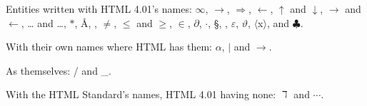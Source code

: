 Entities written with HTML 4.01's names: \(\infty\), \(\rightarrow\), \(\Rightarrow\),
\(\leftarrow\), \(\uparrow\) and \(\downarrow\), \(\to\) and \(\gets\), \dots{} and \dots{}, \(\ast\),
\AA{}, \textpm{}, \(\neq\), \(\le\) and \(\ge\), \(\in\), \(\partial\), \(\cdot\), \S, \dag{}, \(\varepsilon\),
\(\vartheta\), \(\langle\)x\(\rangle\), \textbullet{} and \(\clubsuit\).

With their own names where HTML has them: \(\alpha\), \(\vert{}\) and \(\rightarrow\).

As themselves: / and \_.

With the HTML Standard's names, HTML 4.01 having none: \(\daleth\) and \(\cdots{}\).
